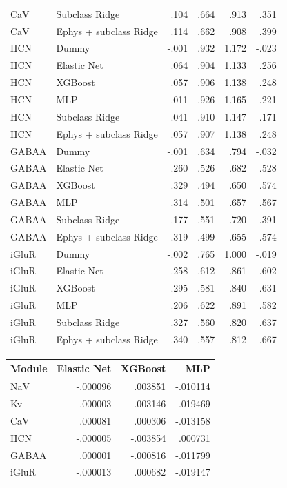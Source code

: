\documentclass[11pt]{article}
\newcommand{\tablefont}{\fontsize{9.5}{11.2}\selectfont}
\newcommand{\sourcecaption}[1]{\Needspace{10\baselineskip}\vspace{2pt}{\small\bfseries #1}\par\vspace{2pt}}
\begin{document}
{\begin{longtable}{@{}llrrrr@{}}
CaV & Subclass Ridge & .104 & .664 & .913 & .351 \\
CaV & Ephys + subclass Ridge & .114 & .662 & .908 & .399 \\
HCN & Dummy & -.001 & .932 & 1.172 & -.023 \\
HCN & Elastic Net & .064 & .904 & 1.133 & .256 \\
HCN & XGBoost & .057 & .906 & 1.138 & .248 \\
HCN & MLP & .011 & .926 & 1.165 & .221 \\
HCN & Subclass Ridge & .041 & .910 & 1.147 & .171 \\
HCN & Ephys + subclass Ridge & .057 & .907 & 1.138 & .248 \\
GABAA & Dummy & -.001 & .634 & .794 & -.032 \\
GABAA & Elastic Net & .260 & .526 & .682 & .528 \\
GABAA & XGBoost & .329 & .494 & .650 & .574 \\
GABAA & MLP & .314 & .501 & .657 & .567 \\
GABAA & Subclass Ridge & .177 & .551 & .720 & .391 \\
GABAA & Ephys + subclass Ridge & .319 & .499 & .655 & .574 \\
iGluR & Dummy & -.002 & .765 & 1.000 & -.019 \\
iGluR & Elastic Net & .258 & .612 & .861 & .602 \\
iGluR & XGBoost & .295 & .581 & .840 & .631 \\
iGluR & MLP & .206 & .622 & .891 & .582 \\
iGluR & Subclass Ridge & .327 & .560 & .820 & .637 \\
iGluR & Ephys + subclass Ridge & .340 & .557 & .812 & .667 \\
\bottomrule
\end{longtable}}

\sourcecaption{Change in $R^2$: 23-feature minus 24-feature reference analysis (Table S13).}
\begin{center}\tablefont
\begin{tabular}{lrrr}
\toprule
Module & Elastic Net & XGBoost & MLP \\
\midrule
NaV & -.000096 & .003851 & -.010114 \\
Kv & -.000003 & -.003146 & -.019469 \\
CaV & .000081 & .000306 & -.013158 \\
HCN & -.000005 & -.003854 & .000731 \\
GABAA & .000001 & -.000816 & -.011799 \\
iGluR & -.000013 & .000682 & -.019147 \\
\bottomrule
\end{tabular}
\end{center}
\end{document}
